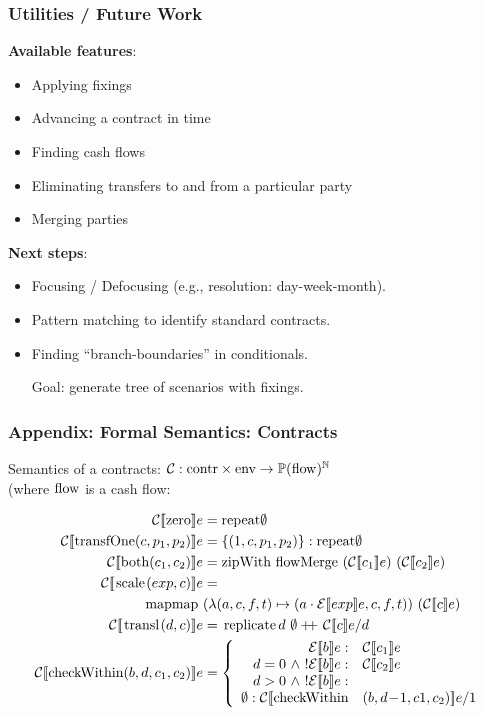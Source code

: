 \documentclass[xcolor=dvipsnames,11pt]{beamer}
\renewcommand{\emph}[1]{\textcolor{structure!90}{#1}}
\newcommand{\ttt}[1]{\mbox{\cd{#1}}}
\newcommand{\zero}{\ttt{zero}}
\newcommand{\transfOne}{\ttt{transfOne}}
\newcommand{\scale}{\ttt{scale}}
\newcommand{\transl}{\ttt{transl}}
\newcommand{\both}{\ttt{both}}
\newcommand{\checkWithin}{\ttt{checkWithin}}
\begin{document}
\begin{frame}
\frametitle{Utilities / Future Work}

\textbf{Available features}:
\begin{itemize}
  \item Applying fixings
  \item Advancing a contract in time
  \item Finding cash flows
  \item Eliminating transfers to and from a particular party
  \item Merging parties
\end{itemize}

\textbf{Next steps}:
\begin{itemize}
  \item Focusing / Defocusing  (e.g., resolution: day-week-month).
  \item Pattern matching to identify standard contracts.
  \item Finding ``branch-boundaries'' in conditionals.

      \emph{Goal:} generate tree of scenarios with fixings.
\end{itemize}
\end{frame}

\begin{frame}
    \frametitle{Appendix: Formal Semantics: Contracts}

Semantics of a contracts: $ \mathcal{C} : \ttt{contr} \times \ttt{env} 
          \rightarrow \mathbb{P}(\ttt{flow})^\mathbb{N}$\\
{\footnotesize
(where $\ttt{flow}$ is a cash flow: 
}

{\footnotesize
\begin{align*}
\csem{\zero}{e}{\ttt{repeat} \emptyset}\\
\csem{\transfOne(c,p_1,p_2)}{e}{\{(1,c,p_1,p_2)\} : \ttt{repeat} \emptyset }\\
\csem{\both(c_1,c_2)}{e}{\ttt{zipWith flowMerge }\ (\mathcal{C}\sem{c_1}e)\ (\mathcal{C}\sem{c_2}e)}\\
\csem{\scale(exp,c)}{e}{}\\
\ttt{mapmap}\ &(\lambda (a,c,f,t)\mapsto(a\cdot\mathcal{E}\sem{exp}e,c,f,t))\ (\mathcal{C}\sem{c}e)\\
\csem{\transl(d,c)}{e}{\ttt{replicate }d \ \emptyset +\!\!\!+\  \mathcal{C}\sem{c}e/d}\\
\csem{\checkWithin(b,d,c_1,c_2)}{e}{
\left \{
\begin{array}{rl}
\mathcal{E}\sem{b}e: & \mathcal{C}\sem{c_1}e\\
d = 0\ \wedge\ !\mathcal{E}\sem{b}e: & \mathcal{C}\sem{c_2}e\\
d > 0\ \wedge\ !\mathcal{E}\sem{b}e:\\
\emptyset : \mathcal{C}\sem{\checkWithin&(b,d\!-\!1,c1,c_2)}e/1\\
\end{array}\right.
}
\end{align*}
}

\end{frame}
\end{document}
